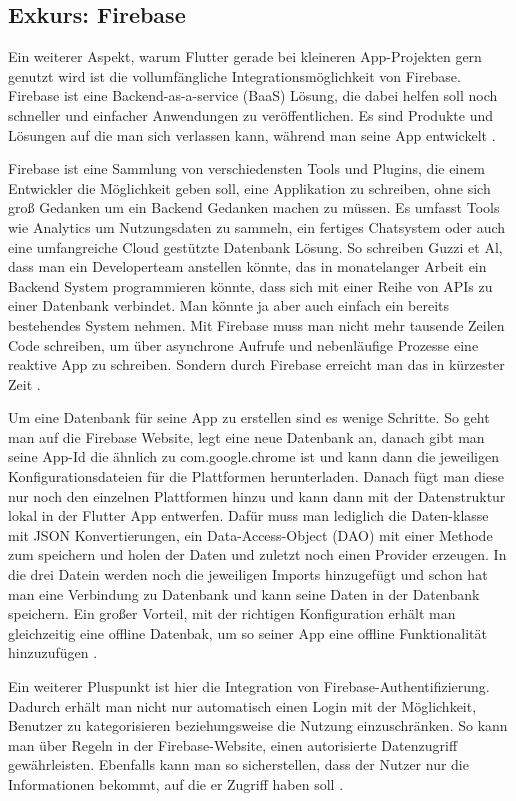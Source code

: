 \subsection{Exkurs: Firebase}
Ein weiterer Aspekt, warum Flutter gerade bei kleineren App-Projekten gern genutzt wird ist die vollumfängliche Integrationsmöglichkeit von Firebase. Firebase ist eine Backend-as-a-service (BaaS) Lösung, die dabei helfen soll noch schneller und einfacher Anwendungen zu veröffentlichen. Es sind Produkte und Lösungen auf die man sich verlassen kann, während man seine App entwickelt \cite{firebase_documentation}.

Firebase ist eine Sammlung von verschiedensten Tools und Plugins, die einem Entwickler die Möglichkeit geben soll, eine Applikation zu schreiben, ohne sich groß Gedanken um ein Backend Gedanken machen zu müssen. Es umfasst Tools wie Analytics um Nutzungsdaten zu sammeln, ein fertiges Chatsystem oder auch eine umfangreiche Cloud gestützte Datenbank Lösung. So schreiben Guzzi et Al, dass man ein Developerteam anstellen könnte, das in monatelanger Arbeit ein Backend System programmieren könnte, dass sich mit einer Reihe von APIs zu einer Datenbank verbindet. Man könnte ja aber auch einfach ein bereits bestehendes System nehmen. Mit Firebase muss man nicht mehr tausende Zeilen Code schreiben, um über asynchrone Aufrufe und nebenläufige Prozesse eine reaktive App zu schreiben. Sondern durch Firebase erreicht man das in kürzester Zeit \cite[p.~608]{Flutter_Apprentice}.

Um eine Datenbank für seine App zu erstellen sind es wenige Schritte. So geht man auf die Firebase Website, legt eine neue Datenbank an, danach gibt man seine App-Id die ähnlich zu com.google.chrome ist und kann dann die jeweiligen Konfigurationsdateien für die Plattformen herunterladen. Danach fügt man diese nur noch den einzelnen Plattformen hinzu und kann dann mit der Datenstruktur lokal in der Flutter App entwerfen. Dafür muss man lediglich die Daten-klasse mit JSON Konvertierungen, ein Data-Access-Object (DAO) mit einer Methode zum speichern und holen der Daten und zuletzt noch einen Provider erzeugen. In die drei Datein werden noch die jeweiligen Imports hinzugefügt und schon hat man eine Verbindung zu Datenbank und kann seine Daten in der Datenbank speichern. Ein großer Vorteil, mit der richtigen Konfiguration erhält man gleichzeitig eine offline Datenbak, um so seiner App eine offline Funktionalität hinzuzufügen \cite{Flutter_Apprentice}.

Ein weiterer Pluspunkt ist hier die Integration von Firebase-Authentifizierung. Dadurch erhält man nicht nur automatisch einen Login mit der Möglichkeit, Benutzer zu kategorisieren beziehungsweise die Nutzung einzuschränken. So kann man über Regeln in der Firebase-Website, einen autorisierte Datenzugriff gewährleisten. Ebenfalls kann man so sicherstellen, dass der Nutzer nur die Informationen bekommt, auf die er Zugriff haben soll \cite{Flutter_Apprentice}.


